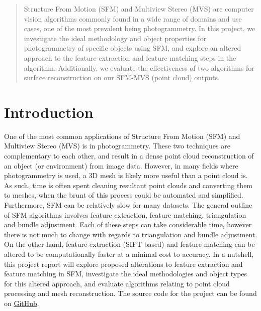 \documentclass[conference,compsoc]{IEEEtran}
\begin{document}
\begin{abstract}
    Structure From Motion (SFM) and Multiview Stereo (MVS) are computer vision
    algorithms commonly found in a wide range of domains and use cases, 
    one of the most prevalent being photogrammetry. In this project, 
    we investigate the ideal methodology and object properties for photogrammetry 
    of specific objects using SFM, and explore an altered approach to the feature 
    extraction and feature matching steps in the algorithm. Additionally, we evaluate 
    the effectiveness of two algorithms for surface reconstruction on our SFM-MVS 
    (point cloud) outputs. 
\end{abstract}





%
\IEEEpeerreviewmaketitle



\section{Introduction}
One of the most common applications of Structure From Motion (SFM) 
and Multiview Stereo (MVS) is in photogrammetry. These two techniques 
are complementary to each other, and result in a dense point cloud reconstruction 
of an object (or environment) from image data. However, in many fields where 
photogrammetry is used, a 3D mesh is likely more useful than a point cloud is. 
As such, time is often spent cleaning resultant point clouds and converting them 
to meshes, when the brunt of this process could be automated and simplified. 
Furthermore, SFM can be relatively slow for many datasets. The general outline of 
SFM algorithms involves feature extraction, feature matching, triangulation and 
bundle adjustment. Each of these steps can take considerable time, however there 
is not much to change with regards to triangulation and bundle adjustment. 
On the other hand, feature extraction (SIFT \cite{sift} based) and feature 
matching can be altered to be computationally faster at a minimal 
cost to accuracy. In a nutshell, this project report will explore 
proposed alterations to feature extraction and feature matching in SFM, 
investigate the ideal methodologies and object types for this altered 
approach, and evaluate algorithms relating to point cloud processing and 
mesh reconstruction. The source code for the project can be found on
\href{https://github.com/roddylan/SFM-to-Mesh}{GitHub}.
\end{document}
